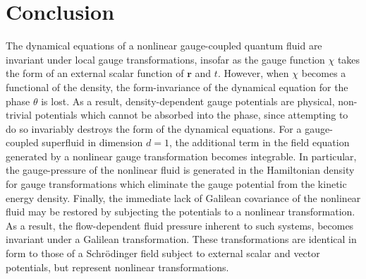 \documentclass[twocolumn, nofootinbib, nobibnotes, amsmath,amssymb,aps, pra, floatfix]{revtex4-1}
\renewcommand{\v}[1]{\ensuremath{\mathbf{#1}}} %
\begin{document}
\section{Conclusion}
The dynamical equations of a nonlinear gauge-coupled quantum fluid are invariant under local gauge transformations, insofar as the gauge function $\chi$ takes the form of an external scalar function of $\v{r}$ and $t$.
However, when $\chi$ becomes a functional of the density, the form-invariance of the dynamical equation for the phase $\theta$ is lost.
As a result, density-dependent gauge potentials are physical, non-trivial potentials which cannot be absorbed into the phase, since attempting to do so invariably destroys the form of the dynamical equations.
For a gauge-coupled superfluid in dimension $d=1$, the additional term in the field equation generated by a nonlinear gauge transformation becomes integrable.
In particular, the gauge-pressure of the nonlinear fluid is generated in the Hamiltonian density for gauge transformations which eliminate the gauge potential from the kinetic energy density.
Finally, the immediate lack of Galilean covariance of the nonlinear fluid may be restored by subjecting the potentials to a nonlinear transformation.
As a result, the flow-dependent fluid pressure inherent to such systems, becomes invariant under a Galilean transformation.
These transformations are identical in form to those of a Schr\"odinger field subject to external scalar and vector potentials, but represent nonlinear transformations.


\end{document}
